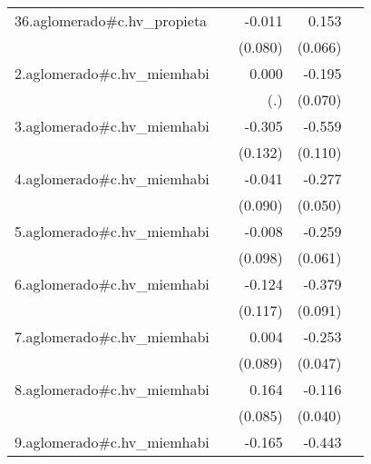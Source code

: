 {\begin{longtable}{l*{4}{D{.}{.}{-1}}}
\addlinespace
36.aglomerado#c.hv\_propieta&                     &      -0.011         &       0.153\sym{*}  &                     \\
            &                     &     (0.080)         &     (0.066)         &                     \\
\addlinespace
2.aglomerado#c.hv\_miemhabi&                     &       0.000         &      -0.195\sym{**} &                     \\
            &                     &         (.)         &     (0.070)         &                     \\
\addlinespace
3.aglomerado#c.hv\_miemhabi&                     &      -0.305\sym{*}  &      -0.559\sym{***}&                     \\
            &                     &     (0.132)         &     (0.110)         &                     \\
\addlinespace
4.aglomerado#c.hv\_miemhabi&                     &      -0.041         &      -0.277\sym{***}&                     \\
            &                     &     (0.090)         &     (0.050)         &                     \\
\addlinespace
5.aglomerado#c.hv\_miemhabi&                     &      -0.008         &      -0.259\sym{***}&                     \\
            &                     &     (0.098)         &     (0.061)         &                     \\
\addlinespace
6.aglomerado#c.hv\_miemhabi&                     &      -0.124         &      -0.379\sym{***}&                     \\
            &                     &     (0.117)         &     (0.091)         &                     \\
\addlinespace
7.aglomerado#c.hv\_miemhabi&                     &       0.004         &      -0.253\sym{***}&                     \\
            &                     &     (0.089)         &     (0.047)         &                     \\
\addlinespace
8.aglomerado#c.hv\_miemhabi&                     &       0.164         &      -0.116\sym{**} &                     \\
            &                     &     (0.085)         &     (0.040)         &                     \\
\addlinespace
9.aglomerado#c.hv\_miemhabi&                     &      -0.165         &      -0.443\sym{***}&                     \\

\end{longtable}}
